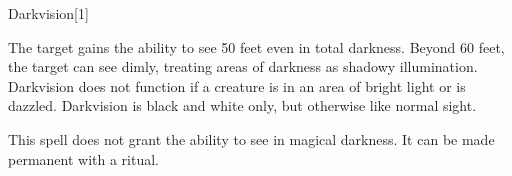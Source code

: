 \begin{spellsection}{Darkvision}[1]
    \begin{spellheader}
    \end{spellheader}
    \begin{spellcontent}
        \begin{spelltargetinginfo}
        \end{spelltargetinginfo}
        \begin{spelleffects}
            \spelleffect The target gains the ability to see 50 feet even in total darkness. Beyond 60 feet, the target can see dimly, treating areas of darkness as shadowy illumination. Darkvision does not function if a creature is in an area of bright light or is dazzled. Darkvision is black and white only, but otherwise like normal sight.
            \spelldur \durlong
        \end{spelleffects}
    \end{spellcontent}
    \begin{spellfooter}
        \spellnotes This spell does not grant the ability to see in magical darkness. It can be made permanent with a  ritual.
        \miscastexplode
    \end{spellfooter}
\end{spellsection}

